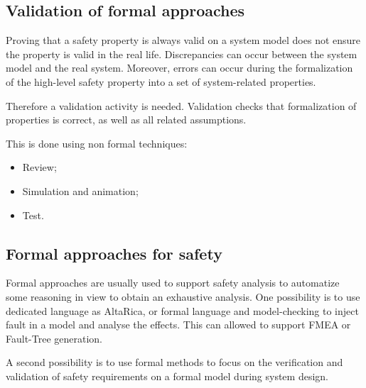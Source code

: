 \subsection{Validation of formal approaches}

Proving that a safety property is always valid on a system model does
not ensure the property is valid in the real life. Discrepancies can
occur between the system model and the real system. Moreover, errors
can occur during the formalization of the high-level safety property
into a set of system-related properties.

Therefore a validation activity is needed. Validation checks that
formalization of properties is correct, as well as all related
assumptions.

This is done using non formal techniques:
\begin{itemize}
\item Review;
\item Simulation and animation;
\item Test.
\end{itemize}

\subsection{Formal approaches for safety}


Formal approaches are usually  used to support safety analysis to  automatize some reasoning in view to obtain an exhaustive analysis.
One possibility is to use dedicated language as AltaRica, or formal language and model-checking  to inject fault in a model and analyse the effects. This can allowed to support FMEA or Fault-Tree generation.

A second possibility is to use formal methods to focus on the verification and validation of safety requirements on a formal model during system design.



